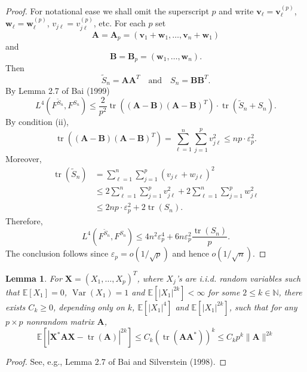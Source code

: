 \documentclass[a4paper,11pt]{book}
\theoremstyle{plain}
\newtheorem{lmm}[thm]{Lemma}
\theoremstyle{definition}
\newcommand{\ME}{\mathbb{E}}
\newcommand{\MN}{\mathbb{N}}
\newcommand{\Var}{\operatorname{Var}}
\newcommand{\tr}{\operatorname{tr}}
\begin{document}
    \begin{proof}
    	For notational ease we shall omit the superscript $p$ and write $\mathbf{v}_\ell = \mathbf{v}_\ell^{(p)}$, $\mathbf{w}_\ell = \mathbf{w}_\ell^{(p)}$, $v_{j\ell} = v_{j\ell}^{(p)}$, etc. For each $p$ set 
    	\[ \mathbf{A} = \mathbf{A}_p = (\mathbf{v}_1 + \mathbf{w}_1, \dots, \mathbf{v}_n + \mathbf{w}_1) \]
    	and
    	\[ \mathbf{B} = \mathbf{B}_p = (\mathbf{w}_1, \dots,  \mathbf{w}_n). \]
    	Then
    	\[ \widetilde{S}_n = \mathbf{AA}^T \quad \text{and} \quad S_n = \mathbf{BB}^T. \]
    	By Lemma 2.7 of Bai (1999)
    	\[L^4(F^{\widetilde{S}_n}, F^{S_n}) \leq \frac{2}{p^2} \tr((\mathbf{A}-\mathbf{B})(\mathbf{A}-\mathbf{B})^T) \cdot \tr(\widetilde{S}_n + S_n). \]
    	By condition (ii),
    	\[ \tr((\mathbf{A}-\mathbf{B})(\mathbf{A}-\mathbf{B})^T)  = \sum_{\ell=1}^{n} \sum_{j=1}^{p} v_{j\ell}^2 \leq np \cdot \varepsilon_p^2. \]
    	Moreover,
    	\[
    	\begin{aligned}
    	\tr(\widetilde{S}_n) &= \sum_{\ell=1}^{n} \sum_{j=1}^{p} (v_{j\ell} + w_{j\ell})^2 \\
    	& \leq 2 \sum_{\ell=1}^{n} \sum_{j=1}^{p} v_{j\ell}^2 + 2\sum_{\ell=1}^{n} \sum_{j=1}^{p} w_{j\ell}^2 \\
    	& \leq 2np \cdot \varepsilon_p^2 + 2 \tr(S_n).
    	\end{aligned}
    	 \]
    	 Therefore,
    	 \[L^4(F^{\widetilde{S}_n}, F^{S_n}) \leq 4n^2\varepsilon_p^4 + 6n\varepsilon_p^2 \frac{\tr(S_n)}{p}. \]
    	 The conclusion follows since $\varepsilon_p = o(1/\sqrt{p})$ and hence $o(1/\sqrt{n})$.
    \end{proof}
    
    \begin{lmm} \label{lmm 9}
    	For $\mathbf{X} = (X_1, \dots, X_p)^T$, where $X_j$'s are i.i.d. random variables such that $\ME[X_1] = 0$, $\Var(X_1) = 1$ and $\ME[|X_1|^{2k}] < \infty$ for some $2 \leq k \in \MN$, there exists $C_k \geq 0$, depending only on $k$, $\ME[|X_1|^4]$ and $\ME[|X_1|^{2k}]$, such that for any $p \times p$ nonrandom matrix $\mathbf{A}$,
    	\[ \ME[|\mathbf{X}^* \mathbf{A} \mathbf{X} - \tr(\mathbf{A}) |^{2k}] \leq C_k(\tr(\mathbf{AA}^*))^k \leq C_k p^k \|\mathbf{A} \|^{2k}  \]
    \end{lmm}
    \begin{proof}
    	See, e.g., Lemma 2.7 of Bai and Silverstein (1998).
    \end{proof}
    
\end{document}
